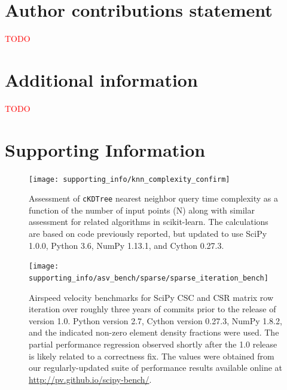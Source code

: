 \documentclass[fleqn,10pt]{wlscirep}
\newcommand{\fixme}[1]{\textcolor{red}{{#1}}}
\begin{document}
\section*{Author contributions statement}

\fixme{TODO}


\section*{Additional information}

\fixme{TODO}

\section*{Supporting Information}

\renewcommand{\thefigure}{S\arabic{figure}}
\renewcommand{\thetable}{S\arabic{table}}
\setcounter{figure}{0}
\setcounter{table}{0}

\begin{figure}[H]
\centering
\texttt{[image: supporting\_info/knn\_complexity\_confirm]}
\caption{Assessment of \texttt{cKDTree} nearest neighbor query time complexity as a function of the number of input points (N) along with similar assessment for related algorithms in scikit-learn. The calculations are based on code previously reported\cite{knn-jake}, but updated to use SciPy 1.0.0, Python 3.6, NumPy 1.13.1, and Cython 0.27.3.}
\label{fig:knn-complexity}
\end{figure}

\begin{figure}[H]
\centering
\texttt{[image: supporting\_info/asv\_bench/sparse/sparse\_iteration\_bench]}
\caption{Airspeed velocity benchmarks for SciPy CSC and CSR matrix row iteration over roughly three years of commits prior to the release of version 1.0. Python version 2.7, Cython version 0.27.3, NumPy 1.8.2, and the indicated non-zero element density fractions were used. The partial performance regression observed shortly after the 1.0 release is likely related to a correctness fix\cite{sparse-regress}. The values were obtained from our regularly-updated suite of performance results available online at \url{http://pv.github.io/scipy-bench/}.}
\label{fig:sparse-iter}
\end{figure}
\end{document}
